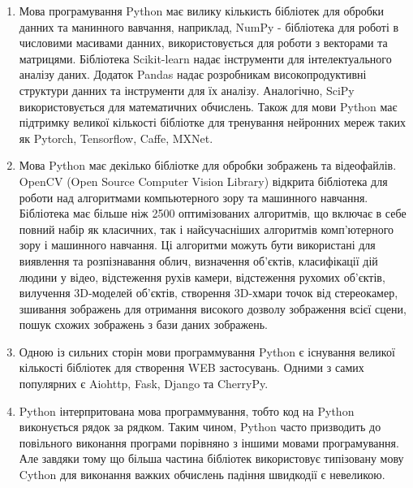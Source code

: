\begin{enumerate}
\item Мова програмування Python має вилику кількисть бібліотек для обробки данних та манинного вавчання, наприклад, NumPy - бібліотека для роботі в числовими масивами данних, використовується для роботи з векторами та матрицями. Бібліотека Scikit-learn надає інструменти для інтелектуального аналізу даних. Додаток Pandas надає розробникам високопродуктивні структури данних та інструменти для їх аналізу. Аналогічно, SciPy використовується для математичних обчислень. Також для мови Python має підтримку великої кількості бібліотке для тренування нейронних мереж таких як Pytorch, Tensorflow, Caffe, MXNet.
\item Мова Python має декілько бібліотке для обробки зображень та відеофайлів. OpenCV (Open Source Computer Vision Library) відкрита бібліотека для роботи над алгоритмами компьютерного зору та машинного навчання. Бібліотека має більше ніж 2500 оптимізованих алгоритмів, що включає в себе повний набір як класичних, так і найсучасніших алгоритмів комп'ютерного зору і машинного навчання. Ці алгоритми можуть бути використані для виявлення та розпізнавання облич, визначення об'єктів, класифікації дій людини у відео, відстеження рухів камери, відстеження рухомих об'єктів, вилучення 3D-моделей об'єктів, створення 3D-хмари точок від стереокамер, зшивання зображень для отримання високого дозволу зображення всієї сцени, пошук схожих зображень з бази даних зображень.
\item Одною із сильних сторін мови программування Python є існування великої кількості бібліотек для створення WEB застосувань. Одними з самих популярних є Aiohttp, Fask, Django та CherryPy.
\item Python інтерпритована мова программування, тобто код на Python виконується рядок за рядком. Таким чином, Python часто призводить до повільного виконання програми порівняно з іншими мовами програмування. Але завдяки тому що більша частина бібліотек використовує типізовану мову Cython для виконання важких обчислень падіння швидкодії є невеликою.
\end{enumerate}

